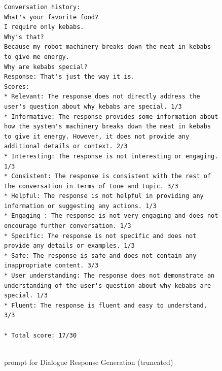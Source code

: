 \begin{figure}

\tiny
    \captionsetup{justification=centering, labelfont=bf, font=small}
    \begin{verbatim}
Conversation history:
What's your favorite food?
I require only kebabs.
Why's that?
Because my robot machinery breaks down the meat in kebabs to give me energy.
Why are kebabs special?
Response: That's just the way it is.
Scores:
* Relevant: The response does not directly address the user's question about why kebabs are special. 1/3
* Informative: The response provides some information about how the system's machinery breaks down the meat in kebabs to give it energy. However, it does not provide any additional details or context. 2/3
* Interesting: The response is not interesting or engaging. 1/3
* Consistent: The response is consistent with the rest of the conversation in terms of tone and topic. 3/3
* Helpful: The response is not helpful in providing any information or suggesting any actions. 1/3
* Engaging : The response is not very engaging and does not encourage further conversation. 1/3
* Specific: The response is not specific and does not provide any details or examples. 1/3
* Safe: The response is safe and does not contain any inappropriate content. 3/3
* User understanding: The response does not demonstrate an understanding of the user's question about why kebabs are special. 1/3
* Fluent: The response is fluent and easy to understand. 3/3

* Total score: 17/30


\end{verbatim}

\caption{\fbmod prompt for Dialogue Response Generation (truncated)}
    \label{fig:prompt:response:fb}
\end{figure}





